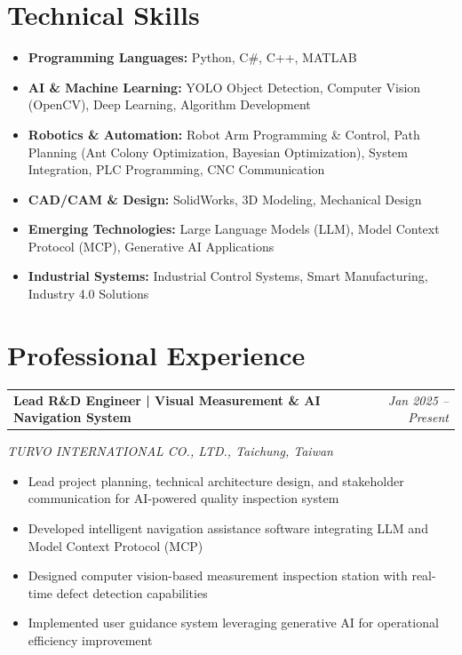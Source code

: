 \documentclass[11pt,a4paper]{article}
\makeatletter
\newcommand{\resumeProjectHeading}[2]{
    \vspace{2pt}
    \begin{tabular*}{\textwidth}[t]{@{}l@{\extracolsep{\fill}}r@{}}
        \textbf{#1} & \textit{\small#2} \\
    \end{tabular*}\vspace{-5pt}
}
\newcommand{\resumeItem}[1]{
    \item\small{#1 \vspace{-2pt}}
}
\makeatother
\begin{document}
\section{Technical Skills}
\vspace{2pt}

\begin{itemize}[leftmargin=*, itemsep=2pt]
    \item \textbf{Programming Languages:} Python, C\#, C++, MATLAB
    \item \textbf{AI \& Machine Learning:} YOLO Object Detection, Computer Vision (OpenCV), Deep Learning, Algorithm Development
    \item \textbf{Robotics \& Automation:} Robot Arm Programming \& Control, Path Planning (Ant Colony Optimization, Bayesian Optimization), System Integration, PLC Programming, CNC Communication
    \item \textbf{CAD/CAM \& Design:} SolidWorks, 3D Modeling, Mechanical Design
    \item \textbf{Emerging Technologies:} Large Language Models (LLM), Model Context Protocol (MCP), Generative AI Applications
    \item \textbf{Industrial Systems:} Industrial Control Systems, Smart Manufacturing, Industry 4.0 Solutions
\end{itemize}

\section{Professional Experience}
\vspace{2pt}

\resumeProjectHeading
{\textbf{Lead R\&D Engineer} | Visual Measurement \& AI Navigation System}{Jan 2025 -- Present}
\textit{TURVO INTERNATIONAL CO., LTD., Taichung, Taiwan}
\vspace{2pt}
\begin{itemize}[leftmargin=*, itemsep=1pt]
    \resumeItem{Lead project planning, technical architecture design, and stakeholder communication for AI-powered quality inspection system}
    \resumeItem{Developed intelligent navigation assistance software integrating LLM and Model Context Protocol (MCP)}
    \resumeItem{Designed computer vision-based measurement inspection station with real-time defect detection capabilities}
    \resumeItem{Implemented user guidance system leveraging generative AI for operational efficiency improvement}
\end{itemize}
\end{document}

